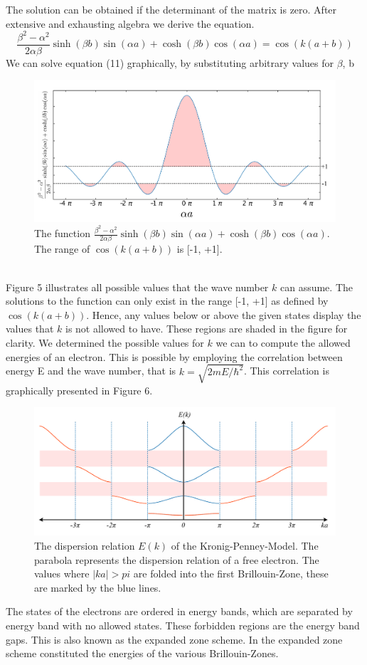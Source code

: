 \documentclass[12pt]{article}
\begin{document}
The solution can be obtained if the determinant of the matrix is zero. After extensive and exhausting algebra we derive the equation.
\begin{equation}
	\frac{\beta^2 - \alpha^2}{2\alpha \beta} \sinh(\beta b) \sin(\alpha a) + \cosh(\beta b) \cos(\alpha a) = \cos(k(a+b)) 
\end{equation}
We can solve equation (11) graphically, by substituting arbitrary values for $\beta$, b 
\begin{figure}[hbt]
	\caption{The function $\frac{\beta^2 - \alpha^2}{2\alpha \beta} \sinh(\beta b) \sin(\alpha a) + \cosh(\beta b) \cos(\alpha a)$. The range of $\cos(k(a+b))$ is [-1, +1].}
	\includegraphics[width=\textwidth]{introduction/wave_number_graph}
\end{figure}
\\
Figure 5 illustrates all possible values that the wave number $k$ can assume. The solutions to the function can only exist in the range [-1, +1] as defined by $\cos(k(a+b))$. Hence, any values below or above the given states display the values that $k$ is not allowed to have. These regions are shaded in the figure for clarity. 
We determined the possible values for $k$ we can to compute the allowed energies of an electron. This is possible by employing the correlation between energy E and the wave number, that is $k = \sqrt{2mE/\hbar^2}$. This correlation is graphically presented in Figure 6.
\clearpage
\begin{figure}[hbt]
	\caption{The dispersion relation $E(k)$ of the Kronig-Penney-Model. The parabola represents the dispersion relation of a free electron. The values where $|ka|>pi$ are folded into the first Brillouin-Zone, these are marked by the blue lines.}
	\includegraphics[width=\textwidth]{introduction/bruillon_zone}
\end{figure}
The states of the electrons are ordered in energy bands, which are separated by energy band with no allowed states. These forbidden regions are the energy band gaps. This is also known as the expanded zone scheme. In the expanded zone scheme constituted the energies of the various Brillouin-Zones. 
\end{document}
